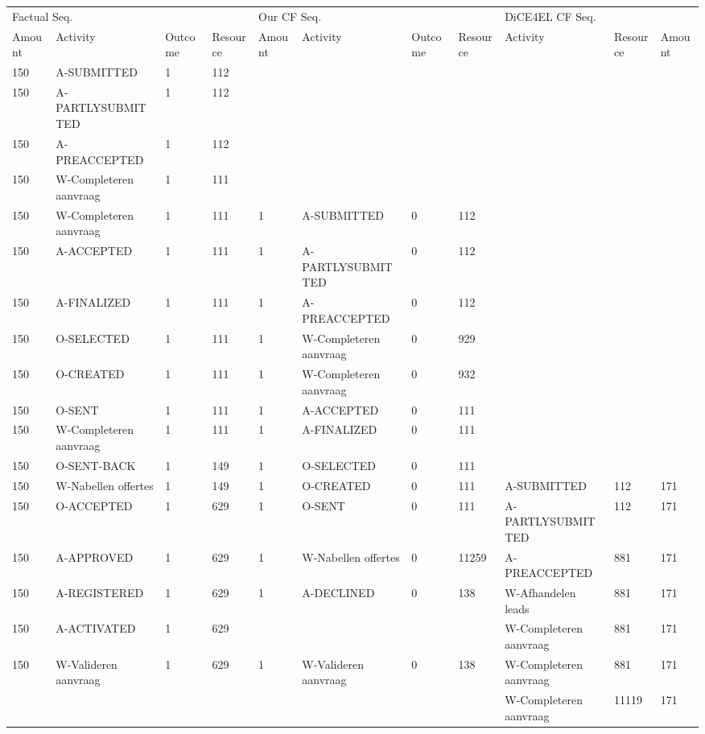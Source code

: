 \begin{tabular}{lllllllllll}
\toprule
\multicolumn{4}{l}{Factual Seq.} & \multicolumn{4}{l}{Our CF Seq.} & \multicolumn{3}{l}{DiCE4EL CF Seq.} \\
Amount & Activity & Outcome & Resource & Amount & Activity & Outcome & Resource & Activity & Resource & Amount \\
\midrule
150 & A-SUBMITTED & 1 & 112 &  &  &  &  &  &  &  \\
150 & A-PARTLYSUBMITTED & 1 & 112 &  &  &  &  &  &  &  \\
150 & A-PREACCEPTED & 1 & 112 &  &  &  &  &  &  &  \\
150 & W-Completeren aanvraag & 1 & 111 &  &  &  &  &  &  &  \\
150 & W-Completeren aanvraag & 1 & 111 & 1 & A-SUBMITTED & 0 & 112 &  &  &  \\
150 & A-ACCEPTED & 1 & 111 & 1 & A-PARTLYSUBMITTED & 0 & 112 &  &  &  \\
150 & A-FINALIZED & 1 & 111 & 1 & A-PREACCEPTED & 0 & 112 &  &  &  \\
150 & O-SELECTED & 1 & 111 & 1 & W-Completeren aanvraag & 0 & 929 &  &  &  \\
150 & O-CREATED & 1 & 111 & 1 & W-Completeren aanvraag & 0 & 932 &  &  &  \\
150 & O-SENT & 1 & 111 & 1 & A-ACCEPTED & 0 & 111 &  &  &  \\
150 & W-Completeren aanvraag & 1 & 111 & 1 & A-FINALIZED & 0 & 111 &  &  &  \\
150 & O-SENT-BACK & 1 & 149 & 1 & O-SELECTED & 0 & 111 &  &  &  \\
150 & W-Nabellen offertes & 1 & 149 & 1 & O-CREATED & 0 & 111 & A-SUBMITTED & 112 & 171 \\
150 & O-ACCEPTED & 1 & 629 & 1 & O-SENT & 0 & 111 & A-PARTLYSUBMITTED & 112 & 171 \\
150 & A-APPROVED & 1 & 629 & 1 & W-Nabellen offertes & 0 & 11259 & A-PREACCEPTED & 881 & 171 \\
150 & A-REGISTERED & 1 & 629 & 1 & A-DECLINED & 0 & 138 & W-Afhandelen leads & 881 & 171 \\
150 & A-ACTIVATED & 1 & 629 &  &  &  &  & W-Completeren aanvraag & 881 & 171 \\
150 & W-Valideren aanvraag & 1 & 629 & 1 & W-Valideren aanvraag & 0 & 138 & W-Completeren aanvraag & 881 & 171 \\
 &  &  &  &  &  &  &  & W-Completeren aanvraag & 11119 & 171 \\
\bottomrule
\end{tabular}
